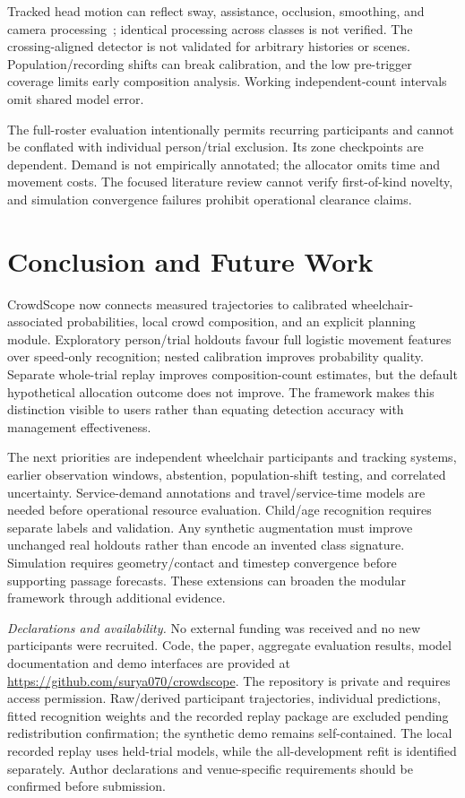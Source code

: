 \documentclass[conference]{IEEEtran}
\begin{document}
Tracked head motion can reflect sway, assistance, occlusion, smoothing, and camera processing~\cite{tracking}; identical processing across classes is not verified. The crossing-aligned detector is not validated for arbitrary histories or scenes. Population/recording shifts can break calibration, and the low pre-trigger coverage limits early composition analysis. Working independent-count intervals omit shared model error.

The full-roster evaluation intentionally permits recurring participants and cannot be conflated with individual person/trial exclusion. Its zone checkpoints are dependent. Demand is not empirically annotated; the allocator omits time and movement costs. The focused literature review cannot verify first-of-kind novelty, and simulation convergence failures prohibit operational clearance claims.

\section{Conclusion and Future Work}
CrowdScope now connects measured trajectories to calibrated wheelchair-associated probabilities, local crowd composition, and an explicit planning module. Exploratory person/trial holdouts favour full logistic movement features over speed-only recognition; nested calibration improves probability quality. Separate whole-trial replay improves composition-count estimates, but the default hypothetical allocation outcome does not improve. The framework makes this distinction visible to users rather than equating detection accuracy with management effectiveness.

The next priorities are independent wheelchair participants and tracking systems, earlier observation windows, abstention, population-shift testing, and correlated uncertainty. Service-demand annotations and travel/service-time models are needed before operational resource evaluation. Child/age recognition requires separate labels and validation. Any synthetic augmentation must improve unchanged real holdouts rather than encode an invented class signature. Simulation requires geometry/contact and timestep convergence before supporting passage forecasts. These extensions can broaden the modular framework through additional evidence.

\smallskip\noindent\textit{Declarations and availability.}
No external funding was received and no new participants were recruited. Code, the paper, aggregate evaluation results, model documentation and demo interfaces are provided at \url{https://github.com/surya070/crowdscope}. The repository is private and requires access permission. Raw/derived participant trajectories, individual predictions, fitted recognition weights and the recorded replay package are excluded pending redistribution confirmation; the synthetic demo remains self-contained. The local recorded replay uses held-trial models, while the all-development refit is identified separately. Author declarations and venue-specific requirements should be confirmed before submission.
\end{document}
